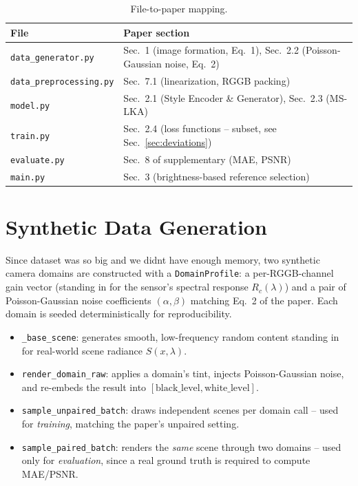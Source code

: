 \documentclass[11pt]{article}
\begin{document}
\begin{table}[h]
\centering
\caption{File-to-paper mapping.}
\label{tab:mapping}
\begin{tabular}{ll}
\hline
\textbf{File} & \textbf{Paper section} \\
\hline
\texttt{data\_generator.py} & Sec.~1 (image formation, Eq.~1),
                              Sec.~2.2 (Poisson-Gaussian noise, Eq.~2) \\
\texttt{data\_preprocessing.py} & Sec.~7.1 (linearization, RGGB packing) \\
\texttt{model.py} & Sec.~2.1 (Style Encoder \& Generator),
                     Sec.~2.3 (MS-LKA) \\
\texttt{train.py} & Sec.~2.4 (loss functions -- subset, see
                     Sec.~\ref{sec:deviations}) \\
\texttt{evaluate.py} & Sec.~8 of supplementary (MAE, PSNR) \\
\texttt{main.py} & Sec.~3 (brightness-based reference selection) \\
\hline
\end{tabular}
\end{table}

\section{Synthetic Data Generation}

Since dataset was so big and we didnt have enough memory, two synthetic camera
domains are constructed with a \texttt{DomainProfile}: a per-RGGB-channel
gain vector (standing in for the sensor's spectral response $R_c(\lambda)$)
and a pair of Poisson-Gaussian noise coefficients $(\alpha, \beta)$
matching Eq.~2 of the paper. Each domain is seeded deterministically for
reproducibility.

\begin{itemize}[nosep]
    \item \texttt{\_base\_scene}: generates smooth, low-frequency random
          content standing in for real-world scene radiance $S(x,\lambda)$.
    \item \texttt{render\_domain\_raw}: applies a domain's tint, injects
          Poisson-Gaussian noise, and re-embeds the result into
          $[\text{black\_level}, \text{white\_level}]$.
    \item \texttt{sample\_unpaired\_batch}: draws independent scenes per
          domain call -- used for \emph{training}, matching the paper's
          unpaired setting.
    \item \texttt{sample\_paired\_batch}: renders the \emph{same} scene
          through two domains -- used only for \emph{evaluation}, since a
          real ground truth is required to compute MAE/PSNR.
\end{itemize}
\end{document}
